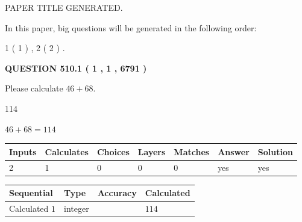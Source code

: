 \documentclass[12pt]{article}
\begin{document}
 
 
 
   
   
 PAPER TITLE GENERATED.
   
   
   
\vspace{0.2in}
   
In this paper, big questions will be generated in the following order: 
   
   
   1 ( 1 )
 ,
   2 ( 2 )
 .
  
\vspace{0.2in}
  
{\textbf{\Large{QUESTION
510.1 
 ( 1 , 1 , 6791 )
}}}
  
  
 
Please calculate $ %
46 +  %
68 $.
 
 
 
\noindent{}
 
 

114
 
 
\noindent{}
 
 

 
 
 
\noindent{}
 
 

$ %
46 +  %
68=   %
114$
 
 
\noindent{}
 
 

 
   
   
   
   
\noindent\begin{tabular}{|l|l|l|l|l|l|l|}
 \hline
Inputs & Calculates & Choices & Layers & Matches & Answer & Solution \\ \hline
 2  & 
 1  & 
 0
  & 
 0  & 
 0  & 
  yes & 
  yes 
  \\ \hline
 \end{tabular}
   
   
   
   
\noindent{}
   
   
  
  
\noindent\begin{tabular}{|l|l|l|l|}
\hline
 Sequential & Type & Accuracy & Calculated \\ 
\hline
 
 
  Calculated $  1 $ & integer &  & 
  $ 114 $ 
 \\  \hline  
 \end{tabular}
   
\end{document}
